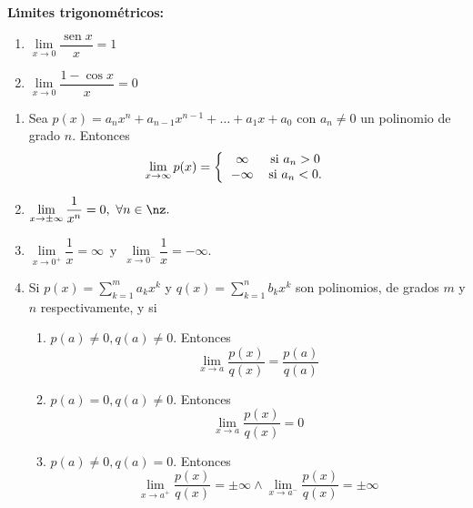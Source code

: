 \begin{theorem}
{\bf L\'{\i}mites trigonom\'{e}tricos: \  }%
%
\label{a4}


\begin{enumerate}
\item $\lim\limits_{x\rightarrow0}\dfrac{\operatorname{sen}x}{x}=1$

\item $\lim\limits_{x\rightarrow0}\dfrac{1-\cos x}{x}=0$
\end{enumerate}

\begin{theorem}%
%
\label{a7}
\end{theorem}

\begin{enumerate}
\item Sea $p(x)=a_{n}x^{n}+a_{n-1}x^{n-1}+\ldots+a_{1}x+a_{0}$ con $a_{n}%
\neq0$ un polinomio de grado $n.$ Entonces%
\[
\lim_{x\rightarrow\infty}p(x)=\left\{
\begin{tabular}
[c]{cc}%
$\infty$ & si$\ a_{n}>0$\\
$-\infty$ & si$\ a_{n}<0.$%
\end{tabular}
\ \ \ \ \right.
\]


\item $\lim\limits_{x\rightarrow\pm\infty}\dfrac{1}{x^{n}}=0,\ \forall
n\in\nz.$

\item $\lim\limits_{x\rightarrow0^{+}}\dfrac{1}{x}=\infty$\ y\ $\lim
\limits_{x\rightarrow0^{-}}\dfrac{1}{x}=-\infty.$

\item Si $p(x)=\sum\limits_{k=1}^{m}a_{k}x^{k}$ y $q(x)=\sum\limits_{k=1}%
^{n}b_{k}x^{k}$ son polinomios, de grados $m$ y $n$ respectivamente, y si

\begin{enumerate}
\item $p\left(  a\right)  \neq0,q\left(  a\right)  \neq0.$ Entonces
\[
\lim\limits_{x\rightarrow a}\frac{p\left(  x\right)  }{q(x)}=\frac{p\left(
a\right)  }{q\left(  a\right)  }%
\]


\item $p\left(  a\right)  =0,q\left(  a\right)  \neq0.$ Entonces
\[
\lim\limits_{x\rightarrow a}\frac{p\left(  x\right)  }{q(x)}=0
\]


\item $p\left(  a\right)  \neq0,q\left(  a\right)  =0.$ Entonces
\[
\lim\limits_{x\rightarrow a^{+}}\frac{p\left(  x\right)  }{q(x)}=\pm
\infty\wedge\lim\limits_{x\rightarrow a^{-}}\frac{p\left(  x\right)  }%
{q(x)}=\pm\infty
\]



\end{enumerate}
\end{enumerate}
\end{theorem}

